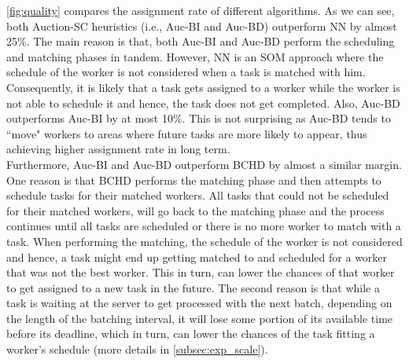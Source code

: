 \cref{fig:quality} compares the assignment rate of different algorithms. As we can see, both Auction-SC heuristics (i.e., Auc-BI and Auc-BD) outperform NN by almost 25\%. The main reason is that, both Auc-BI and Auc-BD perform the scheduling and matching phases in tandem. However, NN is an SOM approach where the schedule of the worker is not considered when a task is matched with him. Consequently, it is likely that a task gets assigned to a worker while the worker is not able to schedule it and hence, the task does not get completed. Also, Auc-BD outperforms Auc-BI by at most 10\%. This is not surprising as Auc-BD tends to ``move" workers to areas where future tasks are more likely to appear, thus achieving higher assignment rate in long term.\\

Furthermore, Auc-BI and Auc-BD outperform BCHD by almost a similar margin. One reason is that BCHD performs the matching phase and then attempts to schedule tasks for their matched workers. All tasks that could not be scheduled for their matched workers, will go back to the matching phase and the process continues until all tasks are scheduled or there is no more worker to match with a task. When performing the matching, the schedule of the worker is not considered and hence, a task might end up getting matched to and scheduled for a worker that was not the best worker. This in turn, can lower the chances of that worker to get assigned to a new task in the future. The second reason is that while a task is waiting at the server to get processed with the next batch, depending on the length of the batching  interval, it will lose some portion of its available time before its deadline, which in turn, can lower the chances of the task fitting a worker's schedule (more details in \cref{subsec:exp_scale}).\\

